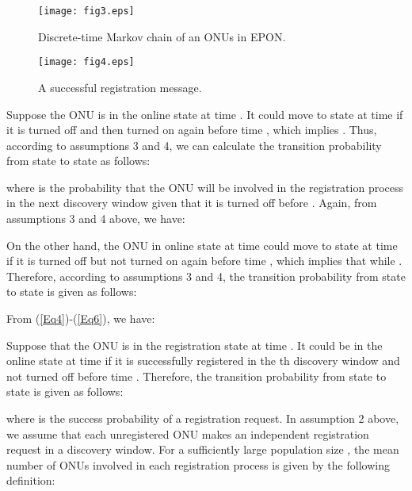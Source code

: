 \documentclass[journal]{IEEEtran}
\begin{document}
\begin{figure}[t]
\centering
\texttt{[image: fig3.eps]}
\caption{Discrete-time Markov chain of an ONUs in EPON.}\label{fig3}
\end{figure}

\begin{figure*}[t]
\centering
\texttt{[image: fig4.eps]}
\caption{A successful registration message.}\label{fig4}
\end{figure*}

Suppose the ONU is in the online state  at time . It could move to state  at time  if it is turned off and then turned on again before time , which implies . Thus, according to assumptions 3 and 4, we can calculate the transition probability  from state  to state  as follows:

where  is the probability that the ONU will be involved in the registration process in the next discovery window given that it is turned off before . Again, from assumptions 3 and 4 above, we have:


On the other hand, the ONU in online state  at time  could move to state  at time  if it is turned off but not turned on again before time , which implies that  while . Therefore, according to assumptions 3 and 4, the transition probability  from state  to state  is given as follows:

From (\ref{Eq4})-(\ref{Eq6}), we have:


Suppose that the ONU is in the registration state  at time . It could be in the online state  at time  if it is successfully registered in the th discovery window and not turned off before time . Therefore, the transition probability  from state  to state  is given as follows:

where  is the success probability of a registration request. In assumption 2 above, we assume that each unregistered ONU makes an independent registration request in a discovery window. For a sufficiently large population size , the mean number of ONUs involved in each registration process is given by the following definition:
\end{document}
